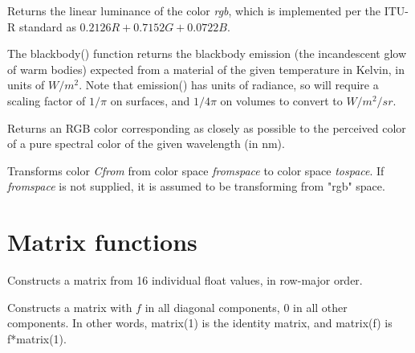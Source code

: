 \documentclass[11pt,letterpaper]{book}
\def\float{{\cf float}\xspace}
\def\matrix{{\cf matrix}\xspace}
\def\rgbspace{{\cf "rgb"} space\xspace}
\begin{document}
Returns the linear luminance of the color \emph{rgb}, which is
implemented per the ITU-R standard as $0.2126 R + 0.7152 G + 0.0722 B$.
\apiend


The {\cf blackbody()} function returns the blackbody emission (the
incandescent glow of warm bodies) expected from a material of the given
temperature in Kelvin, in units of $W/m^2$. Note that {\cf emission()} has units
of radiance, so will require a scaling factor of $1/\pi$ on surfaces, and
$1/4\pi$ on volumes to convert to $W/m^2/sr$.
\apiend

Returns an RGB color corresponding as closely as possible to the
perceived color of a pure spectral color of the given wavelength (in nm).
\apiend

Transforms color \emph{Cfrom} from color space \emph{fromspace} to
color space \emph{tospace}.  If \emph{fromspace} is not supplied,
it is assumed to be transforming from \rgbspace.

\apiend


\section{Matrix functions}
\label{sec:stdlib:matrix}

Constructs a \matrix from 16 individual \float values, in row-major
order.  
\apiend

Constructs a \matrix with $f$ in all diagonal components, 0 in all other
components.  In other words, {\cf matrix(1)} is the identity matrix, and
{\cf matrix(f)} is {\cf f*matrix(1)}.
\apiend
\end{document}
